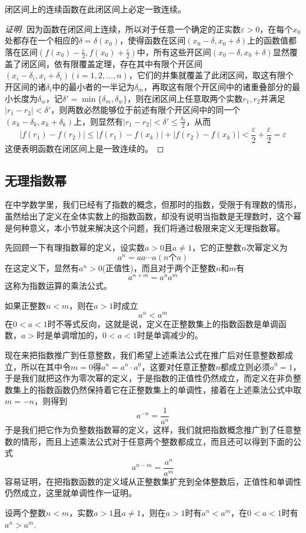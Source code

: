 \begin{theorem}
  闭区间上的连续函数在此闭区间上必定一致连续。
\end{theorem}

\begin{proof}[证明]
  因为函数在闭区间上连续，所以对于任意一个确定的正实数$\varepsilon>0$，在每个$x_0$处都存在一个相应的$\delta=\delta(x_0)$，使得函数在区间$(x_0-\delta,x_0+\delta)$上的函数值都落在区间$(f(x_0)-\frac{\varepsilon}{2},f(x_0)+\frac{\varepsilon}{2})$中，所有这些开区间$(x_0-\delta,x_0+\delta)$显然覆盖了闭区间，依有限覆盖定理，存在其中有限个开区间$(x_i-\delta_i,x_i+\delta_i)(i=1,2,\ldots,n)$，它们的并集就覆盖了此闭区间，取这有限个开区间的诸$\delta_i$中的最小者的一半记为$\delta_m$，再取这有限个开区间中的诸重叠部分的最小长度为$\delta_w$，记$\delta'=\min\{\delta_m,\delta_w\}$，则在闭区间上任意取两个实数$r_1,r_2$并满足$|r_1-r_2|<\delta'$，则两数必然能够位于前述有限个开区间中的同一个$(x_k-\delta_k,x_k+\delta_k)$上，则显然有$|r_1-r_2|<\delta'\leqslant \frac{\delta_k}{2}$，从而
  \[ |f(r_1)-f(r_2)| \leqslant |f(r_1)-f(x_k)|+|f(r_2)-f(x_k)|< \frac{\varepsilon}{2}+\frac{\varepsilon}{2} = \varepsilon \]
  这便表明函数在闭区间上是一致连续的。
\end{proof}

\subsection{无理指数幂}
\label{sec:irrational-power}

在中学数学里，我们已经有了指数的概念，但那时的指数，受限于有理数的情形，虽然给出了定义在全体实数上的指数函数，却没有说明当指数是无理数时，这个幂是何种意义，本小节就来解决这个问题，我们将通过极限来定义无理指数幂。

先回顾一下有理指数幂的定义，设实数$a>0$且$a \neq 1$，它的正整数$n$次幂定义为
\[ a^n = aa\cdots a(n\text{个}a) \]
在这定义下，显然有$a^n>0$(正值性)，而且对于两个正整数$n$和$m$有
\begin{equation}
  \label{eq:exponent-multiple-rule-with-positive-integer}
  a^{n+m}=a^na^m
\end{equation}
这称为指数运算的乘法公式。

如果正整数$n<m$，则在$a>1$时成立
\[ a^n<a^m \]
在$0<a<1$时不等式反向，这就是说，定义在正整数集上的指数函数是单调函数，$a>$时是单调增加的，$0<a<1$时是单调减少的。

现在来把指数推广到任意整数，我们希望上述乘法公式在推广后对任意整数都成立，所以在其中令$m=0$得$a^n=a^n \cdot a^0$，这要对任意正整数$n$都成立则必须$a^0=1$，于是我们就把这作为零次幂的定义，于是指数的正值性仍然成立，而定义在非负整数集上的指数函数仍然保持着它在正整数集上的单调性，接着在上述乘法公式中取$m=-n$，则得到
\[ a^{-n} = \frac{1}{a^n} \]
于是我们把它作为负整数指数幂的定义，这样，我们就把指数概念推广到了任意整数的情形，而且上述乘法公式对于任意两个整数都成立，而且还可以得到下面的公式
\[ a^{n-m} = \frac{a^n}{a^m} \]
容易证明，在把指数函数的定义域从正整数集扩充到全体整数后，正值性和单调性仍然成立，这里就单调性作一证明。
\begin{theorem}
  设两个整数$n<m$，实数$a>1$且$a \neq 1$，则在$a>1$时有$a^n<a^m$，在$0<a<1$时有$a^n>a^m$.
\end{theorem}

